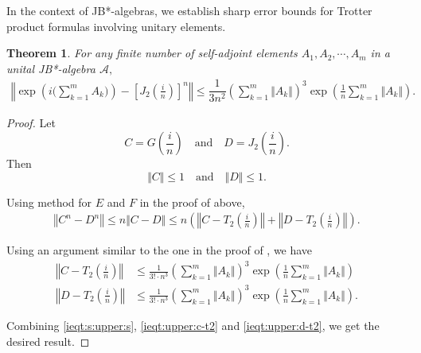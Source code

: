 \documentclass{article}
\theoremstyle{plain} %
\newtheorem{thm}{Theorem}[section]
\numberwithin{equation}{section}
\begin{document}
In the context of JB*-algebras, we establish sharp error bounds for Trotter product formulas involving unitary elements.
\begin{thm}\label{thm:Trotter:first:JB*}
    For any finite number of self-adjoint elements $A_1, A_2,\cdots, A_m$ in a unital JB*-algebra $\mathcal{A},$ 
    \begin{align}\label{ineq:Trotter:first:JB*}
    		\left\Vert \exp \left( i\bigg(\sum_{k=1}^m A_k\bigg)\right)-\left[J_2\left(\frac{i}{n}\right)\right]^n\right \Vert	
    		\leq
    		\dfrac{1}{3n^2}\left( \sum_{k=1}^m \Vert A_k\Vert\right)^3\exp\left(\frac{1}{n}\sum_{k=1}^m {\Vert A_k\Vert}\right).	
    \end{align} 
\end{thm}
\begin{proof}
	Let
\[ C=G\left(\frac{i}{n}\right)\quad \mbox{and}\quad  
		D=J_2\left(\frac{i}{n}\right).\]
Then
\[\Vert C\Vert\leq 1 \quad \mbox{and}\quad 
		\Vert D\Vert\leq 1. \]

Using method for 
 $E$ and $F$ in the proof of  above, 
	\begin{align}
	\left\Vert C^n-D^n \right\Vert 
        \leq n \Vert C-D\Vert 
		\leq n \left(\left\Vert C-T_2\left(\frac{i}{n}\right)\right\Vert +\left\Vert D-T_2\left(\frac{i}{n}\right)\right\Vert\right).\label{ieqt:s:upper:s}
	\end{align}
 
Using an argument similar to the one in the proof of , we have 
	\begin{align}
		\left\Vert C-T_2\left(\frac{i}{n}\right)\right\Vert
&\leq \frac{1}{3!\cdot n^3}\left(\sum_{k=1}^m \Vert A_k\Vert \right)^3\exp \left(\frac{1}{n}\sum_{k=1}^m \Vert A_k\Vert \right) \label{ieqt:upper:c-t2} \\
		\left\Vert D-T_2\left(\frac{i}{n}\right)\right\Vert 
		&\leq \frac{1}{3!\cdot n^3}\left(\sum_{k=1}^m \Vert A_k\Vert \right)^3\exp \left(\frac{1}{n}\sum_{k=1}^m \Vert A_k\Vert \right)  \label{ieqt:upper:d-t2}.
	\end{align}

Combining \cref{ieqt:s:upper:s}, \cref{ieqt:upper:c-t2} and \cref{ieqt:upper:d-t2}, we get the desired result. 
\end{proof}
\end{document}
